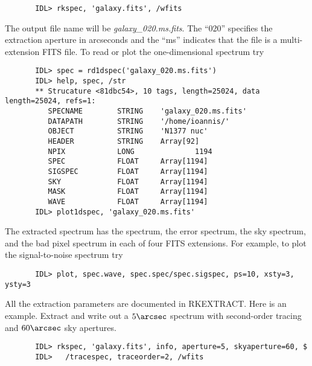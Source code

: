 \documentclass[12pt,preprint]{aastex}
\begin{document}
\begin{verbatim}
       IDL> rkspec, 'galaxy.fits', /wfits
\end{verbatim}

\noindent The output file name will be \emph{galaxy\_020.ms.fits}.  The
``020'' specifies the extraction aperture in arcseconds and the ``ms''
indicates that the file is a multi-extension FITS file.  To read or
plot the one-dimensional spectrum try

\begin{verbatim}
       IDL> spec = rd1dspec('galaxy_020.ms.fits')
       IDL> help, spec, /str
       ** Strucature <81dbc54>, 10 tags, length=25024, data length=25024, refs=1:
       	  SPECNAME        STRING    'galaxy_020.ms.fits'
       	  DATAPATH        STRING    '/home/ioannis/'
       	  OBJECT          STRING    'N1377 nuc'
       	  HEADER          STRING    Array[92]
       	  NPIX            LONG              1194
       	  SPEC            FLOAT     Array[1194]
       	  SIGSPEC         FLOAT     Array[1194]
       	  SKY             FLOAT     Array[1194]
       	  MASK            FLOAT     Array[1194]
       	  WAVE            FLOAT     Array[1194]
       IDL> plot1dspec, 'galaxy_020.ms.fits'
\end{verbatim}

\noindent The extracted spectrum has the spectrum, the error spectrum,
the sky spectrum, and the bad pixel spectrum in each of four FITS
extensions.  For example, to plot the signal-to-noise spectrum try

\begin{verbatim}
       IDL> plot, spec.wave, spec.spec/spec.sigspec, ps=10, xsty=3, ysty=3
\end{verbatim}

\noindent All the extraction parameters are documented in RKEXTRACT.
Here is an example.  Extract and write out a $5\arcsec$ spectrum with
second-order tracing and $60\arcsec$ sky apertures.

\begin{verbatim}
       IDL> rkspec, 'galaxy.fits', info, aperture=5, skyaperture=60, $
       IDL>   /tracespec, traceorder=2, /wfits
\end{verbatim}
\end{document}
